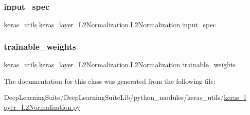 \subsubsection{\texorpdfstring{input\+\_\+spec}{input\_spec}}
{\footnotesize\ttfamily keras\+\_\+utils.\+keras\+\_\+layer\+\_\+\+L2\+Normalization.\+L2\+Normalization.\+input\+\_\+spec}

\mbox{\label{classkeras__utils_1_1keras__layer___l2_normalization_1_1_l2_normalization_a5cb4f097f087e58e797e8132c68b8d9d}} 
\subsubsection{\texorpdfstring{trainable\+\_\+weights}{trainable\_weights}}
{\footnotesize\ttfamily keras\+\_\+utils.\+keras\+\_\+layer\+\_\+\+L2\+Normalization.\+L2\+Normalization.\+trainable\+\_\+weights}



The documentation for this class was generated from the following file\+:\begin{DoxyCompactItemize}
\item 
Deep\+Learning\+Suite/\+Deep\+Learning\+Suite\+Lib/python\+\_\+modules/keras\+\_\+utils/\hyperlink{keras__layer___l2_normalization_8py}{keras\+\_\+layer\+\_\+\+L2\+Normalization.\+py}\end{DoxyCompactItemize}
